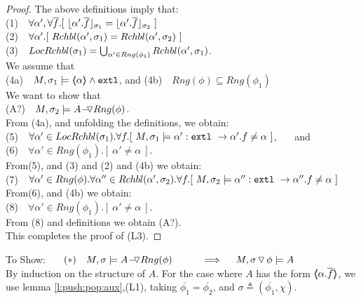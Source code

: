 \begin{proof}
The above definitions imply that: \\
\SP (1)\ \ $\forall \alpha',\forall \overline f.[\  \interpret {\sigma_1} {\alpha'.\overline f} =  \interpret {\sigma_2} {\alpha'.\overline f}\ ]$\\
\SP (2)\ \ $\forall \alpha'.[\  \Relevant {\alpha'} {\sigma_1} = \Relevant {\alpha'} {\sigma_2}\ ]$\\
\SP (3)\ \ $\LRelevantO {\sigma_1} = \bigcup_{\alpha'\in Rng(\phi_1)} \Relevant {\alpha'} {\sigma_1}$.\\
We   assume that\\
\SP (4a)\ \  $M, \sigma_1 \models \inside \alpha \wedge \extThis$, and
\SP (4b)\ \ $Rng(\phi) \subseteq Rng(\phi_1)$\\
We  want to show that\\
\SP (A?)\ \ $M, \sigma_2 \models \PushASLong  {Rng(\phi)} {A}$.\\
From (4a), and unfolding the definitions, we obtain:\\
\SP (5)\ \  $\forall \alpha'\in \LRelevantO {\sigma_1}.\forall f.[ \   M, \sigma_1 \models \alpha':\prg{extl}\ \rightarrow \alpha'.f  \neq \alpha\ ]$, \ \ \ and\\
\SP (6)\ \ $\forall \alpha'\in Rng (\phi_1). [ \ \alpha'\neq \alpha \ ]$.\\
From(5), and   (3) and (2) and (4b) we obtain:
\\
\SP (7)\ \  $\forall \alpha'\in Rng(\phi).\forall \alpha'' \in\Relevant {\alpha'} {\sigma_2}.\forall f.[ \   M, \sigma_2 \models \alpha'':\prg{extl}\ \rightarrow \alpha''.f  \neq \alpha\ ]$ \\
From(6), and   (4b) we obtain:
\\
\SP (8)\ \ $\forall \alpha'\in Rng (\phi_1). [ \ \alpha'\neq \alpha \ ]$.\\
From (8) and definitions we obtain (A?).\\
This completes the proof of (L3). 

\end{proof}


$~$ \\
To Show: \ \ \  $(*)\ \ \ M, \sigma \models \PushASLong  {Rng(\phi)} {A}\  \ \ \ \ \  \ \ \    \Longrightarrow  \ \ \ \ M,  \PushSLong {\phi} {\sigma}   \models A$
\\ $~$ \\
 By  induction on the structure of $A$. For the case where $A$ has the form $\inside {\alpha.\overline f}$, we use lemma \ref{l:push:pop:aux},(L1), taking $\overline {\phi_1} = \overline { \phi_2}$, and $\sigma \triangleq (\overline {\phi_1},\chi).$
\\
\completeProofSub
 

